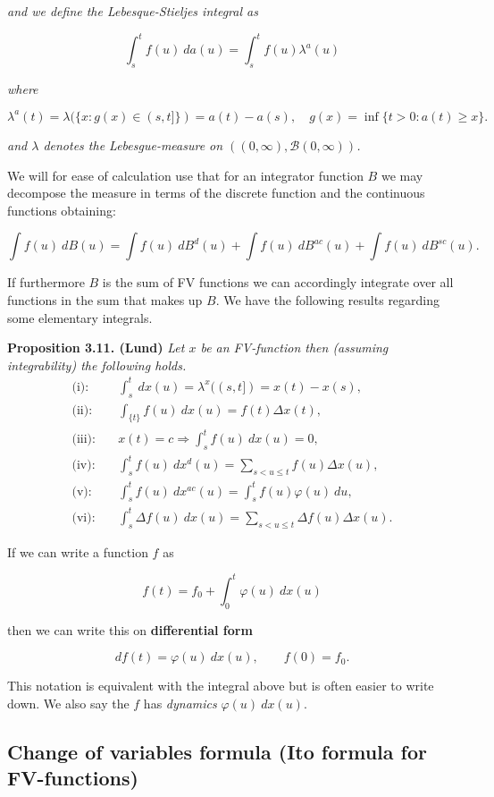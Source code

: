 \documentclass[a4paper,12pt,openany]{book}
\begin{document}
\emph{and we define the Lebesque-Stieljes integral as}

\[
\int_s^tf(u)\ da(u)=\int_s^t f(u)\lambda^a(u)
\]

\emph{where}

\[
\lambda^a(t)=\lambda(\{x : g(x)\in (s,t]\})=a(t)-a(s),\quad g(x)=\inf\{t>0 : a(t)\ge x\}.
\]

\emph{and \(\lambda\) denotes the Lebesgue-measure on \(((0,\infty),\mathcal B(0,\infty))\).}

We will for ease of calculation use that for an integrator function \(B\) we may decompose the measure in terms of the discrete function and the continuous functions obtaining:

\[
\int f(u)\ dB(u)=\int f(u)\ dB^d(u)+\int f(u)\ dB^{ac}(u)+\int f(u)\ dB^{sc}(u).
\]

If furthermore \(B\) is the sum of FV functions we can accordingly integrate over all functions in the sum that makes up \(B\). We have the following results regarding some elementary integrals.

\textbf{Proposition 3.11. (Lund)} \emph{Let \(x\) be an FV-function then (assuming integrability) the following holds.}
\begin{align*}
\text{(i):}&\quad\int_s^t\ dx(u)=\lambda^x((s,t])=x(t)-x(s),\\
\text{(ii):}&\quad \int_{\{t\}}f(u)\ dx(u)=f(t)\Delta x(t),\\
\text{(iii):}&\quad x(t)=c\Longrightarrow \int_s^t f(u)\ dx(u)=0,\\
\text{(iv):}&\quad \int_s^t f(u)\ dx^d(u)=\sum_{s< u\le t} f(u)\Delta x(u),\\
\text{(v):}&\quad \int_s^t f(u)\ dx^{ac}(u)=\int_s^t f(u)\varphi(u)\ du,\\
\text{(vi):}&\quad \int_s^t \Delta f(u)\ dx(u)=\sum_{s< u\le t} \Delta f(u)\Delta x(u).
\end{align*}

If we can write a function \(f\) as

\[
f(t)=f_0+\int_0^t\varphi(u)\ dx(u)
\]

then we can write this on \textbf{differential form}

\[
df(t)=\varphi(u)\ dx(u),\qquad f(0)=f_0.
\]

This notation is equivalent with the integral above but is often easier to write down. We also say the \(f\) has \emph{dynamics} \(\varphi(u)\ dx(u)\).

\hypertarget{change-of-variables-formula-ito-formula-for-fv-functions}{%
\subsection{Change of variables formula (Ito formula for FV-functions)}\label{change-of-variables-formula-ito-formula-for-fv-functions}}
\end{document}
